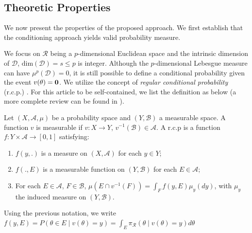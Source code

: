 \documentclass[10pt,fleqn]{article}
\newcommand{\mc}[1]{\mathcal{#1}}
\DeclareMathOperator{\1}{\mathbbm{1}}
\begin{document}
 \subsection{Theoretic Properties}

We now present the properties of the proposed approach. We first establish
that the conditioning approach yields valid probability measure.

We focus on $\mc R$ being a $p$-dimensional Euclidean space and the
intrinsic dimension of $\mc D$, $\mbox{dim}(\mc D)=s\le p$  is integer.
Although the
$p$-dimensional Lebesgue measure can have $\mu^p(\mc D)=0$, it is still possible to define a conditional probability given the event ${v(\theta)=\bf 0}$. We utilize the concept of {\it regular
conditional probability} (r.c.p.)
\citep{kolmogorov1950foundations}. For this article to be self-contained,
we list the definition as below (a more complete review can be found in \cite{leao2004regular}).

Let $(X, \mathscr A, \mu)$ be a probability space and $(Y, \mathscr B)$ a measurable space. A function $v$ is measurable if $v:X\rightarrow Y$, $v^{-1}(\mathscr B)\in \mathscr A$.
A r.c.p is a function
$f: Y\times \mathscr A \rightarrow[0,1]$ satisfying:

\begin{enumerate}
        \item $f(y, .)$ is a measure on $(X,\mathscr A)$ for each $y \in
        Y$;
        \item $f(., E)$ is a measurable function on $(Y,\mathscr B)$ for each $E\in \mathscr A$;
        \item For each $E \in \mathscr A$, $F\in \mathscr B$,
        $\mu(E \cap v^{-1}(F))=\int_{F} f(y, E) \mu_y(dy)$, with
        $\mu_y$ the induced measure on $(Y,\mathscr B)$.
\end{enumerate}

Using the previous notation, we write $f(y,E)= P(\theta\in E\mid
v(\theta)=y)=\int_E \pi_{\mc R}(\theta
\mid v(\theta)=y) d\theta$
\end{document}
